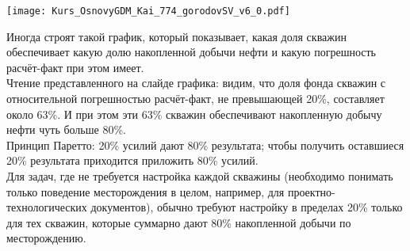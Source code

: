 \texttt{[image: Kurs\_OsnovyGDM\_Kai\_774\_gorodovSV\_v6\_0.pdf]}

Иногда строят такой график, который показывает, какая доля скважин обеспечивает какую долю накопленной добычи нефти и какую погрешность расчёт-факт при этом имеет.
\\

Чтение представленного на слайде графика: видим, что доля фонда скважин с относительной погрешностью расчёт-факт, не превышающей 20\%, составляет около 63\%. И при этом эти 63\% скважин обеспечивают накопленную добычу нефти чуть больше 80\%.\\

Принцип Паретто: 20\% усилий дают 80\% результата; чтобы получить оставшиеся 20\% результата приходится приложить 80\% усилий.\\

Для задач, где не требуется настройка каждой скважины (необходимо понимать только поведение месторождения в целом, например, для проектно-технологических документов), обычно требуют настройку в пределах 20\% только для тех скважин, которые суммарно дают 80\% накопленной добычи по месторождению. 


